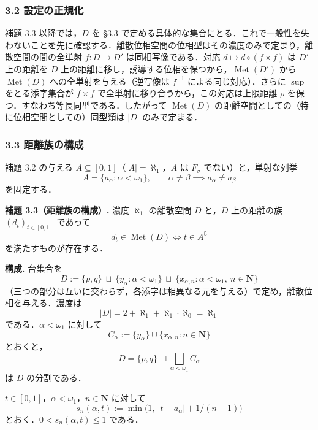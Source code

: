 \documentclass[
  lualatex,ja=standard]{bxjsarticle}
\begin{document}
\hypertarget{ux8a2dux5b9aux306eux6b63ux898fux5316}{%
\subsubsection{3.2
設定の正規化}\label{ux8a2dux5b9aux306eux6b63ux898fux5316}}

補題 3.3 以降では，\(D\) を §3.3
で定める具体的な集合にとる．これで一般性を失わないことを先に確認する．離散位相空間の位相型はその濃度のみで定まり，離散空間の間の全単射
\(f : D \to D'\) は同相写像である．対応
\(d \mapsto d \circ (f \times f)\) は \(D'\) 上の距離を \(D\)
上の距離に移し，誘導する位相を保つから，\(\operatorname{Met}(D')\) から
\(\operatorname{Met}(D)\) への全単射を与える（逆写像は \(f^{-1}\)
による同じ対応）．さらに \(\sup\) をとる添字集合が \(f \times f\)
で全単射に移り合うから，この対応は上限距離 \(\rho\)
を保つ．すなわち等長同型である．したがって \(\operatorname{Met}(D)\)
の距離空間としての（特に位相空間としての）同型類は \(\lvert D\rvert\)
のみで定まる．

\hypertarget{ux8dddux96e2ux65cfux306eux69cbux6210}{%
\subsubsection{3.3
距離族の構成}\label{ux8dddux96e2ux65cfux306eux69cbux6210}}

補題 3.2 の与える
\(A \subseteq [0,1]\)（\(\lvert A\rvert = \aleph_1\)，\(A\) は
\(F_\sigma\) でない）と，単射な列挙
\[A = \{a_\alpha : \alpha < \omega_1\}, \qquad \alpha \ne \beta \implies a_\alpha \ne a_\beta\]
を固定する．

\textbf{補題 3.3（距離族の構成）.} 濃度 \(\aleph_1\) の離散空間 \(D\)
と，\(D\) 上の距離の族 \((d_t)_{t \in [0,1]}\) であって
\[d_t \in \operatorname{Met}(D) \iff t \in A^\complement\]
を満たすものが存在する．

\textbf{構成.} 台集合を
\[D := \{p, q\} \ \sqcup\ \{y_\alpha : \alpha < \omega_1\} \ \sqcup\ \{x_{\alpha,n} : \alpha < \omega_1,\ n \in \mathbf{N}\}\]
（三つの部分は互いに交わらず，各添字は相異なる元を与える）で定め，離散位相を与える．濃度は
\[\lvert D\rvert = 2 + \aleph_1 + \aleph_1 \cdot \aleph_0 = \aleph_1\]
である．\(\alpha < \omega_1\) に対して
\[C_\alpha := \{y_\alpha\} \cup \{x_{\alpha,n} : n \in \mathbf{N}\}\]
とおくと， \[D = \{p,q\} \ \sqcup \bigsqcup_{\alpha<\omega_1} C_\alpha\]
は \(D\) の分割である．

\(t \in [0,1]\)，\(\alpha < \omega_1\)，\(n \in \mathbf{N}\) に対して
\[s_n(\alpha, t) := \min\bigl(1,\ \lvert t - a_\alpha\rvert + 1/(n+1)\bigr)\]
とおく．\(0 < s_n(\alpha,t) \le 1\) である．
\end{document}
